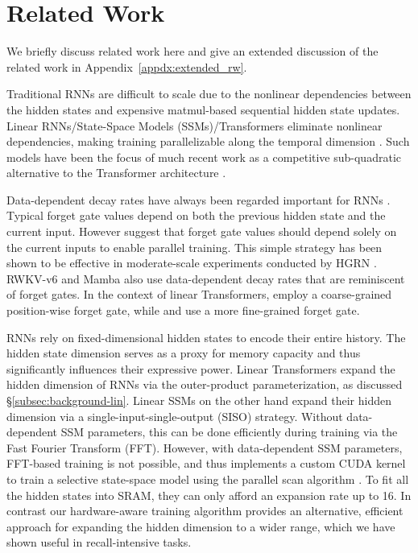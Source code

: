 \section{Related Work}
\label{sec:related}

We briefly discuss related work here and give an extended discussion of the related work in Appendix~\ref{appdx:extended_rw}.

Traditional RNNs are difficult to scale  due to the nonlinear dependencies between the  hidden states and expensive matmul-based sequential hidden state updates. Linear RNNs/State-Space Models (SSMs)/Transformers eliminate nonlinear dependencies, making training parallelizable along the temporal dimension \citep{parallel-martin, s4, s5}. Such models have been the focus of much recent work as a competitive sub-quadratic alternative to the Transformer architecture \citep{rwkv, Gu2023MambaLS,HGRN,qin2023scaling,sun2023retentive,pretrain_wo_attn}.

Data-dependent decay rates have always been regarded important for  RNNs  \citep{DBLP:journals/neco/GersSC00,unreasonable-forget-gate}. Typical forget gate values depend on both the previous hidden state and the current input. However \citet{parallel-martin} suggest that forget gate values should depend solely on the current inputs to enable parallel training. This simple strategy has been shown to be effective in moderate-scale experiments conducted by HGRN \citep{qin2023scaling}.  RWKV-v6 \citep{peng2024eagle} and Mamba \citep{Gu2023MambaLS} also use data-dependent decay rates that are reminiscent of forget gates. In the context of linear Transformers, \citet{peng2021random} employ a coarse-grained position-wise forget gate, while \citet{mao-2022-fine} and \citet{gatedloop} use a more fine-grained forget gate. 

RNNs rely on fixed-dimensional hidden states to encode their entire history. The hidden state dimension  serves as a proxy for memory capacity and thus significantly influences their expressive power. Linear Transformers expand the hidden dimension of RNNs via the outer-product parameterization, as discussed \S\ref{subsec:background-lin}. Linear SSMs on the other hand expand their hidden dimension via a single-input-single-output (SISO) strategy. Without data-dependent SSM parameters, this can be done efficiently during training via the Fast Fourier Transform (FFT). However, with data-dependent SSM parameters, FFT-based training is not possible, and thus \citet{Gu2023MambaLS} implements a custom CUDA kernel to train a selective state-space model using the parallel scan algorithm \citep{s5}. To fit all the hidden states into SRAM, they can only afford an expansion rate up to 16. In contrast our hardware-aware training algorithm provides an alternative, efficient approach for expanding the hidden dimension to a wider range, which we have shown useful in recall-intensive tasks.

